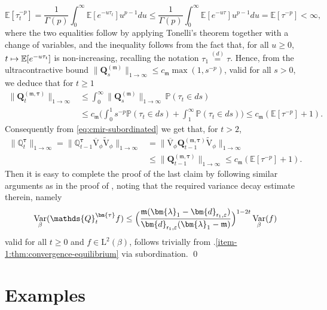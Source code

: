 \documentclass[JEP,XML,SOM,Unicode]{cedram}
\let\epsilon\varepsilon
\newcommand\mto{\mathchoice{\longmapsto}{\mapsto}{\mapsto}{\mapsto}}
\theoremstyle{plain}
\theoremstyle{definition}
\DeclareMathOperator{\Var}{Var}
\newcommand{\E}{\mathbb{E}}
\newcommand{\Prob}{\mathbb{P}}
\newcommand{\J}{\mathds{Q}}
\newcommand{\Leb}{\mathrm{L}}
\newcommand{\m}{\mathfrak{m}}
\newcommand{\dpt}{\bm{d}_{\vat,\epsilon}}
\newcommand{\lam}{{\bm{\lambda}_1}}
\newcommand{\vat}{{\mathsf{r}_1}}
\newcommand{\Q}[1][\mo]{\mathbf{Q}^{({#1})}}
\let\mo\mu
\let\bpsi\beta
\begin{document}
\begin{equation*}
\E[\tau_t^{-p}] = \frac{1}{\Gamma(p)} \int_0^\infty \E[e^{-u \tau_t}] u^{p-1} du \leq \frac{1}{\Gamma(p)} \int_0^\infty \E[e^{-u \tau}] u^{p-1} du = \E[\tau^{-p}] < \infty,
\end{equation*}
where the two equalities follow by applying Tonelli's theorem together with a change of variables, and the inequality follows from the fact that, for all $u\geq0$, $t \mto \E[e^{-u \tau_t}]$ is non-increasing, recalling the notation $\tau_1\stackrel{(d)}{=}\tau$. Hence, from the ultracontractive bound $\|\Q[\m]_s\|_{1 \to \infty} \leq c_\m \max(1,s^{-p})$, valid for all $s > 0$, we deduce that for $t \geq 1$
\begin{align*}
\|\Q[\m,\bm{\tau}]_t\|_{1 \to \infty} &\leq \int_0^\infty \|\Q[\m]_s\|_{1 \to \infty}\, \Prob(\tau_t \in ds)\\
&\leq c_\m \biggl(\int_0^1 s^{-p} \Prob(\tau_t \in ds) + \int_1^\infty \Prob(\tau_t \in ds)  \biggr) \leq c_\m(\E[\tau^{-p}]+1).
\end{align*}
Consequently from \eqref{eq:cmir-subordinated} we get that, for $t > 2$,
\begin{align*}
\|\J_t^{\bm{\tau}}\|_{1\to\infty} = \|\J_{t-1}^{\bm{\tau}} \overline{\mathrm{V}}_\phi \widetilde{\mathrm{V}}_\phi\|_{1\to\infty} &= \|\overline{\mathrm{V}}_\phi \Q[\m,\bm{\tau}]_{t-1} \widetilde{\mathrm{V}}_\phi\|_{1\to\infty}\\
&\leq \|\Q[\m,\bm{\tau}]_{t-1}\|_{1 \to \infty} \leq c_\m(\E[\tau^{-p}]+1).
\end{align*}
Then it is easy to complete the proof of the last claim by following similar arguments as in the proof of \cite[Prop.\,6.3.4]{Bakry_Book}, noting that the required variance decay estimate therein, namely
\begin{equation*}
\Var_\bpsi(\J_t^{\bm{\tau}} f) \leq \Bigl(\frac{\m(\lam-\dpt)}{\dpt(\lam-\m)}\Bigr)^{1-2t} \Var_\bpsi(f)
\end{equation*}
valid for all $t \geq 0$ and $f \in \Leb^2(\bpsi)$, follows trivially from .\eqref{item-1:thm:convergence-equilibrium} via subordination. \qed

\section{Examples} \label{sec:examples}
\end{document}
